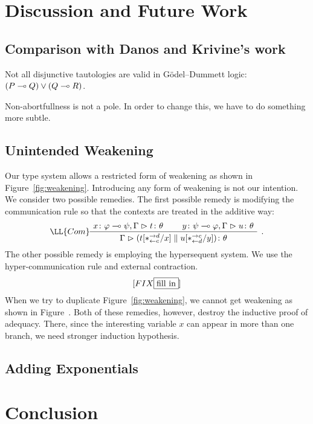 \section{Discussion and Future Work}

\subsection{Comparison with Danos and Krivine's work}




Not all disjunctive tautologies are valid in G\"odel--Dummett logic:
$(P\multimap Q)\lor(Q\multimap R)$.

Non-abortfullness is not a pole.
In order to change this, we have to do something more subtle.

\subsection{Unintended Weakening}

Our type system allows a restricted form of weakening as shown in
Figure~\ref{fig:weakening}.  Introducing any form of weakening is not
our intention.  We consider two possible remedies.  The first possible
remedy is modifying the communication rule so that the contexts are
treated in the additive way:
\[
\aseq{\tj{x}{\phi\limp\psi},\G}{\tj t\theta}
\aseq{\tj{y}{\psi\limp\phi},\G}{\tj u\theta}
\LL{Com}
\bseq{\G}{\tj{(t[\comodL/x]\conc u[\comodR/y])}{\theta}}
\DisplayProof\enspace.
\]
The other possible remedy is employing the hypersequent system.  We use
the hyper-communication rule and external contraction.
\[
 [FIX \fbox{fill in}]
\]
When we try to
duplicate Figure~\ref{fig:weakening}, we cannot get weakening as shown
in Figure~.
Both of these remedies, however, destroy the inductive proof of
adequacy.  There, since the
interesting variable $x$ can appear in more than one branch,
we need stronger induction hypothesis.

\subsection{Adding Exponentials}

\section{Conclusion}
